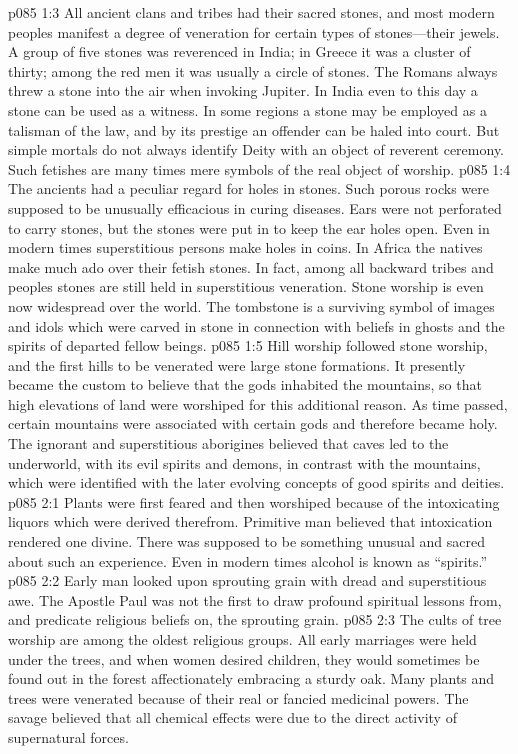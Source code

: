 \vs p085 1:3 All ancient clans and tribes had their sacred stones, and most modern peoples manifest a degree of veneration for certain types of stones---their jewels. A group of five stones was reverenced in India; in Greece it was a cluster of thirty; among the red men it was usually a circle of stones. The Romans always threw a stone into the air when invoking Jupiter. In India even to this day a stone can be used as a witness. In some regions a stone may be employed as a talisman of the law, and by its prestige an offender can be haled into court. But simple mortals do not always identify Deity with an object of reverent ceremony. Such fetishes are many times mere symbols of the real object of worship.\plusone
\vs p085 1:4 The ancients had a peculiar regard for holes in stones. Such porous rocks were supposed to be unusually efficacious in curing diseases. Ears were not perforated to carry stones, but the stones were put in to keep the ear holes open. Even in modern times superstitious persons make holes in coins. In Africa the natives make much ado over their fetish stones. In fact, among all backward tribes and peoples stones are still held in superstitious veneration. Stone worship is even now widespread over the world. The tombstone is a surviving symbol of images and idols which were carved in stone in connection with beliefs in ghosts and the spirits of departed fellow beings.
\vs p085 1:5 Hill worship followed stone worship, and the first hills to be venerated were large stone formations. It presently became the custom to believe that the gods inhabited the mountains, so that high elevations of land were worshiped for this additional reason. As time passed, certain mountains were associated with certain gods and therefore became holy. The ignorant and superstitious aborigines believed that caves led to the underworld, with its evil spirits and demons, in contrast with the mountains, which were identified with the later evolving concepts of good spirits and deities.
\vs p085 2:1 Plants were first feared and then worshiped because of the intoxicating liquors which were derived therefrom. Primitive man believed that intoxication rendered one divine. There was supposed to be something unusual and sacred about such an experience. Even in modern times alcohol is known as “spirits.”\plusone
\vs p085 2:2 Early man looked upon sprouting grain with dread and superstitious awe. The Apostle Paul was not the first to draw profound spiritual lessons from, and predicate religious beliefs on, the sprouting grain.
\vs p085 2:3 The cults of tree worship are among the oldest religious groups. All early marriages were held under the trees, and when women desired children, they would sometimes be found out in the forest affectionately embracing a sturdy oak. Many plants and trees were venerated because of their real or fancied medicinal powers. The savage believed that all chemical effects were due to the direct activity of supernatural forces.
